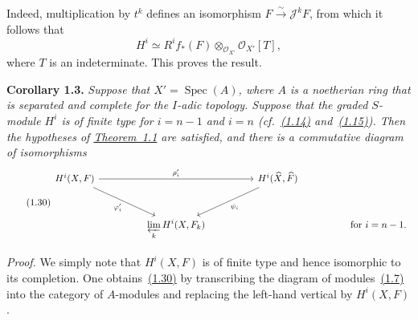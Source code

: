 Indeed, multiplication by $t^k$ defines an isomorphism
$F\xrightarrow{\sim}\mathcal J^kF$, from which it follows that
\begin{equation}
\tag{1.29}\label{eq:IX.1.29}
H^i\simeq R^i f_*(F)\otimes_{\mathcal O_{X'}}\mathcal O_{X'}[T],
\end{equation}
where $T$ is an indeterminate. This proves the result.

\noindent\textbf{Corollary 1.3.}\quad
\emph{Suppose that $X'=\operatorname{Spec}(A)$, where $A$ is a noetherian ring
that is separated and complete for the $I$-adic topology. Suppose that the
graded $S$-module $H^i$ is of finite type for $i=n-1$ and $i=n$
(cf.~\hyperref[eq:IX.1.14]{(1.14)} and~\hyperref[eq:IX.1.15]{(1.15)}). Then the hypotheses of \hyperref[IX.1.1]{Theorem~1.1} are satisfied, and
there is a commutative diagram of isomorphisms}
\begin{equation}
\tag{1.30}\label{eq:IX.1.30}
\begin{tikzcd}[column sep=4.6em,row sep=3.0em]
H^i(X,F)
  \arrow[rr,"\rho_i'"]
  \arrow[dr,"\varphi_i'"']
&& H^i(\widehat X,\widehat F)
  \arrow[dl,"\psi_i"] \\
& \displaystyle\varprojlim_k H^i(X,F_k)
&& \text{for }i=n-1.
\end{tikzcd}
\end{equation}

\noindent\emph{Proof.}\quad
We simply note that $H^i(X,F)$ is of finite type and hence isomorphic to its
completion. One obtains~\hyperref[eq:IX.1.30]{(1.30)} by transcribing the diagram of modules~\hyperref[eq:IX.1.7]{(1.7)}
into the category of $A$-modules and replacing the left-hand vertical by
$H^i(X,F)$.

\medskip
{}

